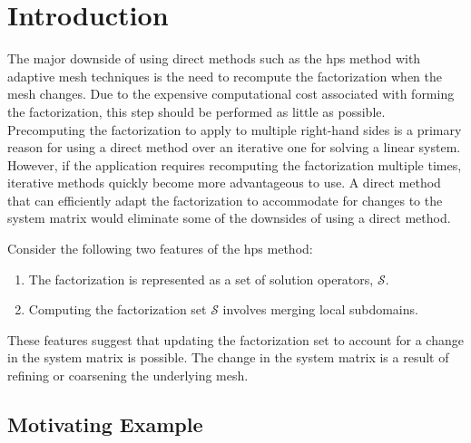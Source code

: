 \section{Introduction}

The major downside of using direct methods such as the \gls{hps} method with adaptive mesh techniques is the need to recompute the factorization when the mesh changes. Due to the expensive computational cost associated with forming the factorization, this step should be performed as little as possible. Precomputing the factorization to apply to multiple right-hand sides is a primary reason for using a direct method over an iterative one for solving a linear system. However, if the application requires recomputing the factorization multiple times, iterative methods quickly become more advantageous to use. A direct method that can efficiently adapt the factorization to accommodate for changes to the system matrix would eliminate some of the downsides of using a direct method.

Consider the following two features of the \gls{hps} method:
\begin{enumerate}
    \item{The factorization is represented as a set of solution operators, $\mathcal{S}$.}
    \item{Computing the factorization set $\mathcal{S}$ involves merging local subdomains.}
\end{enumerate}
These features suggest that updating the factorization set to account for a change in the system matrix is possible. The change in the system matrix is a result of refining or coarsening the underlying mesh. 

\subsection{Motivating Example}

